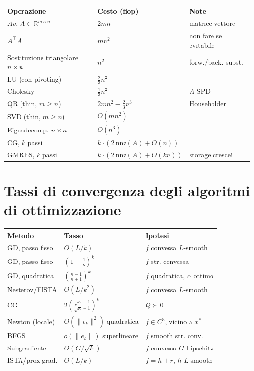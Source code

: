 \documentclass[11pt, a4paper, twoside]{book}
\theoremstyle{definition}
\theoremstyle{plain}
\theoremstyle{remark}
\newcommand{\R}{\mathbb{R}}
\begin{document}
\begin{center}
\renewcommand{\arraystretch}{1.3}
\begin{tabular}{lll}
\hline
\textbf{Operazione} & \textbf{Costo (flop)} & \textbf{Note} \\
\hline
$Av$, $A \in \R^{m \times n}$ & $2mn$ & matrice-vettore \\
$A^\top A$ & $mn^2$ & non fare se evitabile \\
Sostituzione triangolare $n \times n$ & $n^2$ & forw./back. subst. \\
LU (con pivoting) & $\frac{2}{3}n^3$ & \\
Cholesky & $\frac{1}{3}n^3$ & $A$ SPD \\
QR (thin, $m \geq n$) & $2mn^2 - \frac{2}{3}n^3$ & Householder \\
SVD (thin, $m \geq n$) & $O(mn^2)$ & \\
Eigendecomp. $n \times n$ & $O(n^3)$ & \\
CG, $k$ passi & $k \cdot (2\,\mathrm{nnz}(A) + O(n))$ & \\
GMRES, $k$ passi & $k \cdot (2\,\mathrm{nnz}(A) + O(kn))$ & storage cresce! \\
\hline
\end{tabular}
\end{center}

\section{Tassi di convergenza degli algoritmi di ottimizzazione}

\begin{center}
\renewcommand{\arraystretch}{1.5}
\begin{tabular}{p{3.5cm}p{4.5cm}p{4cm}}
\hline
\textbf{Metodo} & \textbf{Tasso} & \textbf{Ipotesi} \\
\hline
GD, passo fisso & $O(L/k)$ & $f$ convessa $L$-smooth \\
GD, passo fisso & $\left(1-\frac{1}{\kappa}\right)^k$ & $f$ str. convessa \\
GD, quadratica & $\left(\frac{\kappa-1}{\kappa+1}\right)^k$ & $f$ quadratica, $\alpha$ ottimo \\
Nesterov/FISTA & $O(L/k^2)$ & $f$ convessa $L$-smooth \\
CG & $2\left(\frac{\sqrt{\kappa}-1}{\sqrt{\kappa}+1}\right)^k$ & $Q \succ 0$ \\
Newton (locale) & $O(\|e_k\|^2)$ quadratica & $f \in C^3$, vicino a $x^*$ \\
BFGS & $o(\|e_k\|)$ superlineare & $f$ smooth str. conv. \\
Subgradiente & $O(G/\sqrt{k})$ & $f$ convessa $G$-Lipschitz \\
ISTA/prox grad. & $O(L/k)$ & $f = h + r$, $h$ $L$-smooth \\
\hline
\end{tabular}
\end{center}
\end{document}
